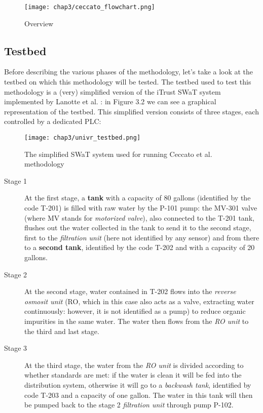 \begin{figure}[ht]
	\centering
	\texttt{[image: chap3/ceccato\_flowchart.png]}
	\caption{Overview}
	\label{fig:ceccato_overview}
\end{figure}

\subsection{Testbed}
\label{subsec:ceccato_testbed}
Before describing the various phases of the methodology, let's take a look at the testbed on which this methodology will be tested. The testbed used to test this methodology is a (very) simplified version of the iTrust SWaT system \cite{swat_home} implemented by Lanotte et al. \cite{lanotte_et_al}: in Figure 3.2 we can see a graphical representation of the testbed. This simplified version consists of three stages, each controlled by a dedicated PLC: 

\begin{figure}[ht]
	\centering
	\texttt{[image: chap3/univr\_testbed.png]}
	\caption{The simplified SWaT system used for running Ceccato et al. methodology}
	\label{fig:univr_testbed}
\end{figure}

\bigskip
\begin{description}
	\item[Stage 1] At the first stage, a \textbf{tank} with a capacity of 80 gallons (identified by the code T-201) is filled with raw water by the P-101 pump: the MV-301 valve (where MV stands for \textit{motorized valve}), also connected to the T-201 tank, flushes out the water collected in the tank to send it to the second stage, first to the \textit{filtration unit} (here not identified by any sensor) and from there to a \textbf{second tank}, identified by the code T-202 and with a capacity of 20 gallons.
	
	\item[Stage 2] At the second stage, water contained in T-202 flows into the \textit{reverse osmosit unit} (RO, which in this case also acts as a valve, extracting water continuously: however, it is not identified as a pump) to reduce organic impurities in the same water. The water then flows from the \textit{RO unit} to the third and last stage.
	
	\item[Stage 3] At the third stage, the water from the \textit{RO unit} is divided according to whether standards are met: if the water is clean it will be fed into the distribution system, otherwise it will go to a \textit{backwash tank}, identified by code T-203 and a capacity of one gallon. The water in this tank will then be pumped back to the stage 2 \textit{filtration unit} through pump P-102.
\end{description}

